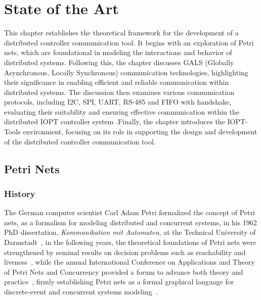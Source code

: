 
%

\chapter{State of the Art}
\label{cha:state_of_the_ art}


\epigraphfontsize{\small\itshape}
\setlength\epigraphwidth{12.5cm}
\setlength\epigraphrule{0pt}

This chapter establishes the theoretical framework for the development of a distributed controller communication tool. It begins with an exploration of Petri nets, which are foundational in modeling the interactions and behavior of distributed systems. Following this, the chapter discusses GALS (Globally Asynchronous, Locally Synchronous) communication technologies, highlighting their significance in enabling efficient and reliable communication within distributed systems. The discussion then examines various communication protocols, including I2C, SPI, UART, RS-485 and FIFO with handshake, evaluating their suitability and ensuring effective communication within the distributed IOPT controller system .Finally, the chapter introduces the IOPT-Tools environment, focusing on its role in supporting the design and development of the distributed controller communication tool.

\section{Petri Nets}
\label{sec:petri_nets}


\subsection{History}
\label{subsec:history}
The German computer scientist Carl Adam Petri formalized the concept of  Petri nets, as a formalism for modeling distributed and concurrent systems, in his 1962 PhD dissertation, \emph{Kommunikation mit Automaten}, at the Technical University of Darmstadt~\cite{petri1962}, in the following years, the theoretical foundations of Petri nets were strengthened by seminal results on decision problems such as reachability and liveness~\cite{murata}, while the annual International Conference on Applications and Theory of Petri Nets and Concurrency provided a forum to advance both theory and practice~\cite{ICPN1980}, firmly establishing Petri nets as a formal graphical language for discrete‐event and concurrent systems modeling~\cite{WikiPetriNet2025}.



